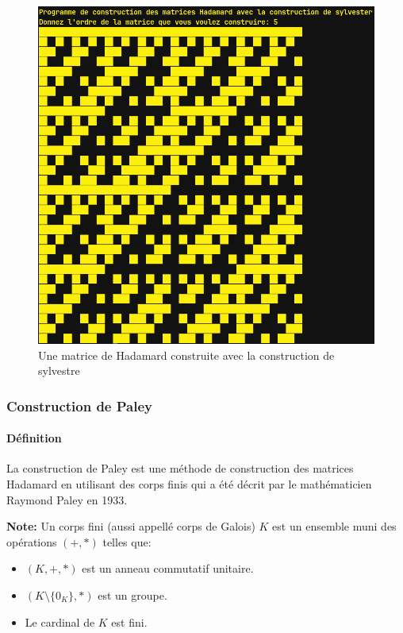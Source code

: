 \documentclass{article}
\begin{document}
\begin{figure}[h]
  \begin{center}
    \includegraphics[width=\textwidth]{sylvester.png}
    \caption{Une matrice de Hadamard construite avec la construction de sylvestre}
  \end{center}
\end{figure}

\newpage
\subsubsection{Construction de Paley}

\paragraph{Définition}

La construction de Paley est une méthode de construction des matrices 
Hadamard en utilisant des corps finis qui a été décrit par le mathématicien
Raymond Paley en 1933.

\textbf{Note:} Un corps fini (aussi appellé corps de Galois) $K$ est un 
ensemble muni des opérations $(+, *)$ telles que:
\begin{itemize}
	\item $(K, +, *)$ est un anneau commutatif unitaire.
	\item $(K\setminus\{0_K\}, *)$ est un groupe.
	\item Le cardinal de $K$ est fini.
\end{itemize}
\end{document}
